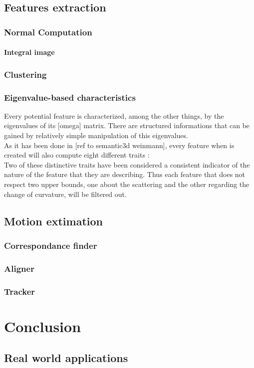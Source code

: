 \documentclass[LaM,binding=0.6cm]{sapthesis}
\begin{document}
\section{Features extraction}

\subsection{Normal Computation}
  \subsubsection{Integral image}

\subsection{Clustering}


\subsection{Eigenvalue-based characteristics}
Every potential feature is characterized, among the other things, by the  eigenvalues  of its [omega] matrix. There are structured informations that can be gained by relatively simple manipulation of this eigenvalues.\\
As it has been done in [ref to semantic3d weinmann], every feature when is created will also compute eight different traits :\\
[mat 8 traits linearity, planarity etc.]
Two of these distinctive traits have been considered a consistent indicator of the nature of the feature that they are describing. Thus each feature that does not respect two upper bounds, one about the scattering and the other regarding the change of curvature, will be filtered out.



\section{Motion extimation}

\subsection{Correspondance finder}
\subsection{Aligner}
\subsection{Tracker}



\chapter{Conclusion}
\section{Real world applications}





\backmatter
\end{document}

